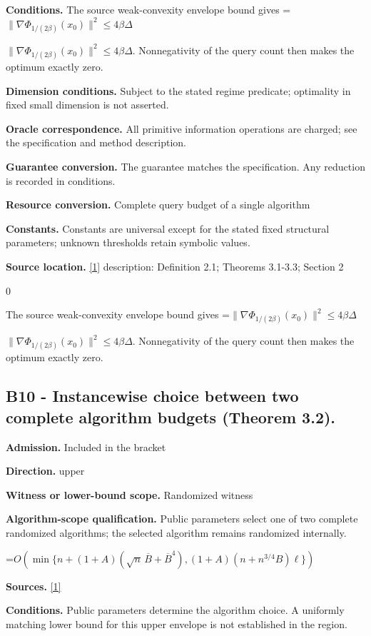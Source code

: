 \documentclass[10pt,a4paper]{article}
\newcommand{\AtlasMath}[1]{\par\begingroup\centering\setbox0=\hbox{$\displaystyle #1$}\ifdim\wd0>1.4\linewidth\typeout{ATLAS WIDE FORMULA: \the\wd0}\fi\ifdim\wd0>\linewidth\resizebox{\linewidth}{!}{\box0}\else\box0\fi\par\endgroup}
\newcommand{\AtlasInlineMath}[1]{\begingroup\setbox0=\hbox{$#1$}\ifdim\wd0>.4\linewidth\endgroup\AtlasMath{#1}\else\endgroup$#1$\fi}
\begin{document}
\textbf{Conditions.} The source weak-convexity envelope bound gives \AtlasInlineMath{\|\nabla\Phi_{1/(2\beta)}(x_0)\|^2\le4\beta\Delta}. Nonnegativity of the query count then makes the optimum exactly zero.

\textbf{Dimension conditions.} Subject to the stated regime predicate; optimality in fixed small dimension is not asserted.

\textbf{Oracle correspondence.} All primitive information operations are charged; see the specification and method description.

\textbf{Guarantee conversion.} The guarantee matches the specification. Any reduction is recorded in conditions.

\textbf{Resource conversion.} Complete query budget of a single algorithm

\textbf{Constants.} Constants are universal except for the stated fixed structural parameters; unknown thresholds retain symbolic values.

\textbf{Source location.} \href{https://arxiv.org/pdf/2610.16991v2}{[1]} description: Definition 2.1; Theorems 3.1-3.3; Section 2

0

The source weak-convexity envelope bound gives \AtlasInlineMath{\|\nabla\Phi_{1/(2\beta)}(x_0)\|^2\le4\beta\Delta}. Nonnegativity of the query count then makes the optimum exactly zero.

\subsection{B10 - Instancewise choice between two complete algorithm budgets (Theorem 3.2).}
\textbf{Admission.} Included in the bracket

\textbf{Direction.} upper

\textbf{Witness or lower-bound scope.} Randomized witness

\textbf{Algorithm-scope qualification.} Public parameters select one of two complete randomized algorithms; the selected algorithm remains randomized internally.

\AtlasMath{O\!\left(\min\{n+(1+A)(\sqrt n\,\overline B+\overline B^4),(1+A)(n+n^{3/4}B)\ell\}\right)}
\textbf{Sources.} \href{https://arxiv.org/pdf/2610.16991v2}{[1]}

\textbf{Conditions.} Public parameters determine the algorithm choice. A uniformly matching lower bound for this upper envelope is not established in the region.
\end{document}
